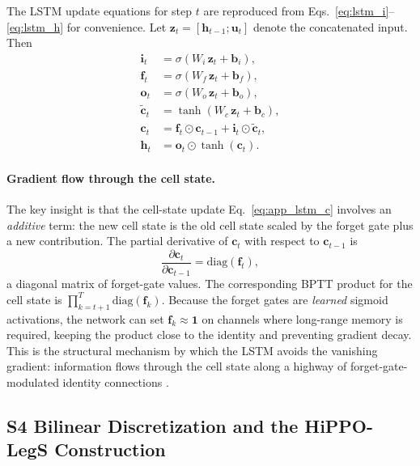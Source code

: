 The LSTM update equations for step $t$ are reproduced from
Eqs.~\eqref{eq:lstm_i}--\eqref{eq:lstm_h} for convenience.  Let
$\mathbf{z}_t = [\mathbf{h}_{t-1};\mathbf{u}_t]$ denote the concatenated input.
Then
\begin{align}
  \mathbf{i}_t &= \sigma(W_i\,\mathbf{z}_t + \mathbf{b}_i), \\
  \mathbf{f}_t &= \sigma(W_f\,\mathbf{z}_t + \mathbf{b}_f), \\
  \mathbf{o}_t &= \sigma(W_o\,\mathbf{z}_t + \mathbf{b}_o), \\
  \tilde{\mathbf{c}}_t &= \tanh(W_c\,\mathbf{z}_t + \mathbf{b}_c), \\
  \mathbf{c}_t &= \mathbf{f}_t \odot \mathbf{c}_{t-1}
                  + \mathbf{i}_t \odot \tilde{\mathbf{c}}_t, \label{eq:app_lstm_c}\\
  \mathbf{h}_t &= \mathbf{o}_t \odot \tanh(\mathbf{c}_t).
\end{align}

\paragraph{Gradient flow through the cell state.}
The key insight is that the cell-state update Eq.~\eqref{eq:app_lstm_c}
involves an \emph{additive} term: the new cell state is the old cell state
scaled by the forget gate plus a new contribution.  The partial derivative of
$\mathbf{c}_t$ with respect to $\mathbf{c}_{t-1}$ is
\begin{equation}\label{eq:lstm_grad}
  \frac{\partial \mathbf{c}_t}{\partial \mathbf{c}_{t-1}}
    = \mathrm{diag}(\mathbf{f}_t),
\end{equation}
a diagonal matrix of forget-gate values.  The corresponding BPTT product for
the cell state is $\prod_{k=t+1}^{T} \mathrm{diag}(\mathbf{f}_k)$.  Because
the forget gates are \emph{learned} sigmoid activations, the network can set
$\mathbf{f}_k \approx \mathbf{1}$ on channels where long-range memory is
required, keeping the product close to the identity and preventing gradient
decay.  This is the structural mechanism by which the LSTM avoids the vanishing
gradient: information flows through the cell state along a highway of
forget-gate-modulated identity connections \cite{Hochreiter1997}.

\subsection{S4 Bilinear Discretization and the HiPPO-LegS Construction}
\label{sec:s4_derivation}

